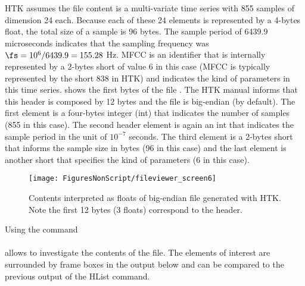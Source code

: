 HTK assumes the file content is a multi-variate time series with 855 samples of dimension 24 each. Because each of these 24 elements is represented by a 4-bytes float, the total size of a sample is 96 bytes. The sample period of 6439.9 microseconds indicates that the sampling frequency was $\fs = 10^6 / 6439.9 = 155.28$ Hz. MFCC is an identifier that is internally represented by a 2-bytes short of value 6 in this case (MFCC is typically represented by the short 838 in HTK) and indicates the kind of parameters in this time series.
 shows the first bytes of the file . The HTK manual informs that this header is composed by 12 bytes and the file is big-endian (by default). The first element is a four-bytes integer (int) that indicates the number of samples (855 in this case). The second header element is again an int that indicates the sample period in the unit of $10^{-7}$ seconds. The third element is a 2-bytes short that informs the sample size in bytes (96 in this case) and the last element is another short that specifies the kind of parameters (6 in this case).

\begin{figure}
	\centering
		\texttt{[image: FiguresNonScript/fileviewer\_screen6]}		
	\caption[{Contents interpreted as floats of big-endian file  generated with HTK.}]{Contents interpreted as floats of big-endian file  generated with HTK. Note the first 12 bytes (3 floats) correspond to the header.\label{fig:fileviewer_screen6}}
\end{figure}

Using the command\\
\\
allows to investigate the contents of the file. The elements of interest are surrounded by frame boxes in the output below and can be compared to the previous output of the HList command.

